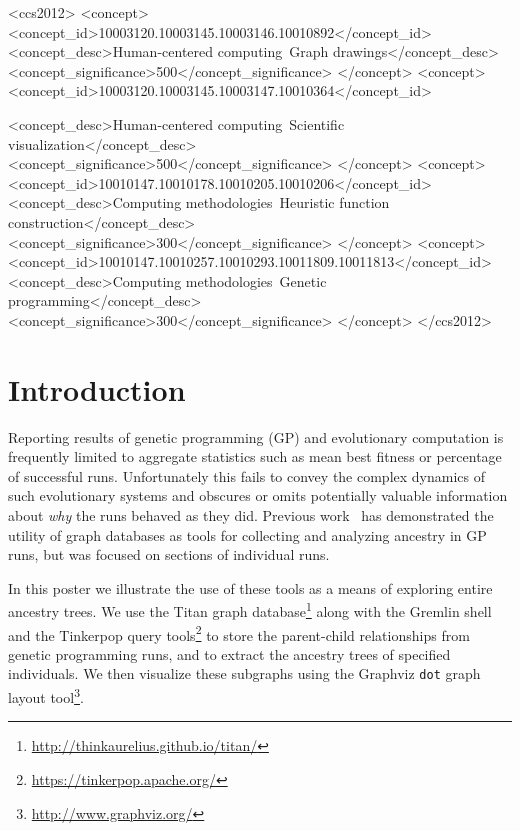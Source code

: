 \documentclass{sig-alternate}
\begin{document}
\begin{CCSXML}
	<ccs2012>
	<concept>
	<concept_id>10003120.10003145.10003146.10010892</concept_id>
	<concept_desc>Human-centered computing~Graph drawings</concept_desc>
	<concept_significance>500</concept_significance>
	</concept>
	<concept>
	<concept_id>10003120.10003145.10003147.10010364</concept_id>

	<concept_desc>Human-centered computing~Scientific visualization</concept_desc>
	<concept_significance>500</concept_significance>
	</concept>
	<concept>
	<concept_id>10010147.10010178.10010205.10010206</concept_id>
	<concept_desc>Computing methodologies~Heuristic function construction</concept_desc>
	<concept_significance>300</concept_significance>
	</concept>
	<concept>
	<concept_id>10010147.10010257.10010293.10011809.10011813</concept_id>
	<concept_desc>Computing methodologies~Genetic programming</concept_desc>
	<concept_significance>300</concept_significance>
	</concept>
	</ccs2012>
\end{CCSXML}


\printccsdesc


\section{Introduction}
\label{sec:introduction}


Reporting results of genetic programming (GP) and evolutionary computation is frequently limited to aggregate statistics such as mean best fitness or percentage of successful runs. Unfortunately this fails to convey the complex dynamics of such evolutionary systems and obscures or omits potentially valuable information about \emph{why} the runs behaved as they did. Previous work~\cite{McPhee:2015:GPTP} has demonstrated the utility of graph databases as tools for collecting and analyzing ancestry in GP runs, but was focused on sections of individual runs.

In this poster we illustrate the use of these tools as a means of exploring entire ancestry trees. We use the Titan graph database\footnote{\url{http://thinkaurelius.github.io/titan/}} along with the Gremlin shell and the Tinkerpop query tools\footnote{\url{https://tinkerpop.apache.org/}} to store the parent-child relationships from genetic programming runs, and to extract the ancestry trees of specified individuals. We then visualize these subgraphs using the Graphviz \texttt{dot} graph layout tool\footnote{\url{http://www.graphviz.org/}}.
\end{document}
